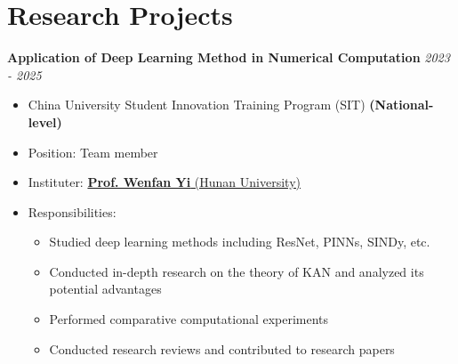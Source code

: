 \documentclass[11pt,a4paper]{article}
\newcommand{\cvitem}[2]{\textbf{#1} \hfill \textit{#2}}
\begin{document}

\section{Research Projects}
\cvitem{Application of Deep Learning Method in Numerical Computation}{\textit{2023 - 2025}}
\begin{itemize}[leftmargin=*,nosep]
    \item China University Student Innovation Training Program (SIT) \textbf{(National-level)}
    \item Position: Team member
    \item Instituter: \href{https://scholar.google.com/citations?user=YLgF7LsAAAAJ}{\textbf{Prof. Wenfan Yi} (Hunan University)}
    \item Responsibilities:
    \begin{itemize}[leftmargin=*,nosep]
        \item Studied deep learning methods including ResNet, PINNs, SINDy, etc.
        \item Conducted in-depth research on the theory of KAN and analyzed its potential advantages
        \item Performed comparative computational experiments
        \item Conducted research reviews and contributed to research papers
    \end{itemize}
\end{itemize}
\end{document}
